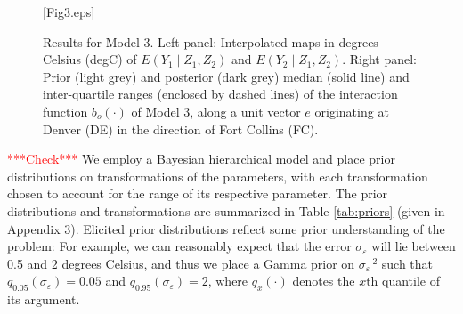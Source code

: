 \documentclass[lineno]{biometrika}
\newcommand{\red}{\textcolor{red}}%
\newcommand{\e}{e}
\newcommand{\Yvec}{Y}
\newcommand{\Zvec}{Z}
\newcommand{\E}{E}
\begin{document}
 \begin{figure}[!t]
\figurebox{19pc}{}{}[Fig3.eps]
 	\caption{Results for Model 3. Left panel: Interpolated maps in degrees Celsius (degC) of $\E(\Yvec_1 \mid  \Zvec_1,\Zvec_2)$ and $\E(\Yvec_2 \mid  \Zvec_1, \Zvec_2)$. Right panel: Prior (light grey) and posterior (dark grey) median (solid line) and inter-quartile ranges (enclosed by dashed lines) of the interaction function $b_o(\cdot)$ of Model 3, along a unit vector $\e$ originating at Denver (DE) in the direction of Fort Collins (FC).} \label{fig:kernel}
 \end{figure}

\red{***Check***} We employ a Bayesian hierarchical model and place prior distributions on transformations of the parameters, with each transformation chosen to account for the range of its respective parameter. The prior distributions and transformations are summarized in Table \ref{tab:priors} (given in Appendix 3). Elicited prior distributions reflect some prior understanding of the problem: For example, we can reasonably expect that the error $\sigma_\varepsilon$ will lie between 0.5 and 2 degrees Celsius, and thus we place a Gamma prior on $\sigma_\varepsilon^{-2}$ such that $q_{0.05}(\sigma_\varepsilon) =0.05$ and $q_{0.95}(\sigma_\varepsilon) = 2$, where $q_x(\cdot)$ denotes the $x$th quantile of its argument.

\end{document}
